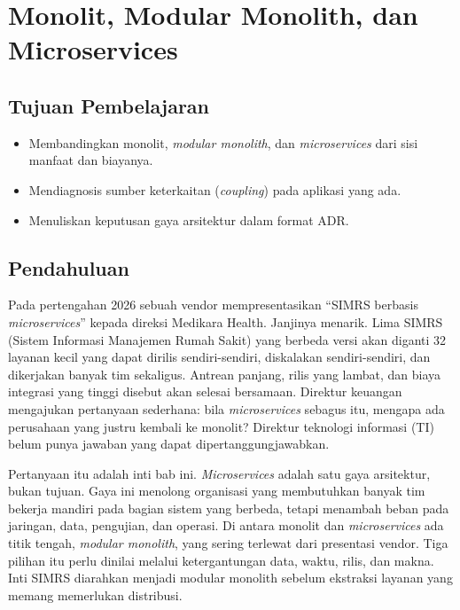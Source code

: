 \chapter{Monolit, Modular Monolith, dan Microservices}
\label{ch:ch07}


\section*{Tujuan Pembelajaran}
\begin{itemize}
  \item Membandingkan monolit, \textit{modular monolith}, dan \textit{microservices} dari sisi
        manfaat dan biayanya.
  \item Mendiagnosis sumber keterkaitan (\textit{coupling}) pada aplikasi yang ada.
  \item Menuliskan keputusan gaya arsitektur dalam format ADR.
\end{itemize}

\section{Pendahuluan}

Pada pertengahan 2026 sebuah vendor mempresentasikan ``SIMRS berbasis \textit{microservices}'' kepada
direksi Medikara Health. Janjinya menarik. Lima SIMRS (Sistem Informasi Manajemen Rumah Sakit) yang
berbeda versi akan diganti 32 layanan kecil yang dapat dirilis sendiri-sendiri, diskalakan
sendiri-sendiri, dan dikerjakan banyak tim sekaligus. Antrean panjang, rilis yang lambat, dan biaya
integrasi yang tinggi disebut akan selesai bersamaan. Direktur keuangan mengajukan pertanyaan
sederhana: bila \textit{microservices} sebagus itu, mengapa ada perusahaan yang justru kembali ke
monolit? Direktur teknologi informasi (TI) belum punya jawaban yang dapat dipertanggungjawabkan.

Pertanyaan itu adalah inti bab ini. \textit{Microservices} adalah satu gaya arsitektur, bukan
tujuan. Gaya ini menolong organisasi yang membutuhkan banyak tim bekerja mandiri pada bagian sistem
yang berbeda, tetapi menambah beban pada jaringan, data, pengujian, dan operasi. Di antara monolit
dan \textit{microservices} ada titik tengah, \textit{modular monolith}, yang sering terlewat dari
presentasi vendor. Tiga pilihan itu perlu dinilai melalui ketergantungan data, waktu, rilis,
dan makna. Inti SIMRS diarahkan menjadi modular monolith sebelum ekstraksi
layanan yang memang memerlukan distribusi.

